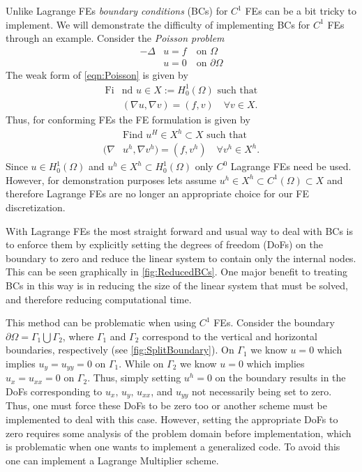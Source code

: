 Unlike Lagrange FEs \emph{boundary conditions} (BCs) for $C^1$ FEs can be a bit
tricky to implement. We will demonstrate the difficulty of implementing BCs for
$C^1$ FEs through an example. Consider the \emph{Poisson problem}
\begin{equation}
  \begin{split}
    -\Delta &u = f \quad \text{on } \Omega \\
    &u = 0 \quad \text{on } \partial \Omega
  \end{split}
  \label{eqn:Poisson}
\end{equation}
The weak form of \eqref{eqn:Poisson} is given by
\begin{equation}
  \begin{split}
    \text{Fi}&\text{nd }u \in X := H^1_0(\Omega) \text{ such that} \\
    &(\nabla u, \nabla v) = (f, v) \quad \forall v \in X.
  \end{split}
  \label{eqn:PoissonWeak}
\end{equation}
Thus, for conforming FEs the FE formulation is given by
\begin{equation}
  \begin{split}
    &\text{Find }u^H \in X^h \subset X \text{ such that} \\
    (\nabla &u^h, \nabla v^h) = (f, v^h) \quad \forall v^h \in X^h.
  \end{split}
  \label{eqn:PoissonFE}
\end{equation}
Since $u \in H^1_0(\Omega)$ and $u^h \in X^h \subset H^1_0(\Omega)$ only $C^0$
Lagrange FEs need be used. However, for demonstration purposes lets assume $u^h
\in X^h \subset C^1(\Omega) \subset X$ and therefore Lagrange FEs are no longer
an appropriate choice for our FE discretization.

With Lagrange FEs the most straight forward and usual way to deal with BCs is to
enforce them by explicitly setting the degrees of freedom (DoFs) on the boundary
to zero and reduce the linear system to contain only the internal nodes. This
can be seen graphically in \autoref{fig:ReducedBCs}. One major benefit to
treating BCs in this way is in reducing the size of the linear system that must
be solved, and therefore reducing computational time.


This method can be problematic when using $C^1$ FEs. Consider the boundary
$\partial \Omega = \Gamma_1 \bigcup \Gamma_2$, where $\Gamma_1$ and $\Gamma_2$
correspond to the vertical and horizontal boundaries, respectively (see
\autoref{fig:SplitBoundary}).  On $\Gamma_1$ we know $u=0$ which implies $u_y =
u_{yy} = 0$ on $\Gamma_1$.  While on $\Gamma_2$ we know $u=0$ which implies $u_x
= u_{xx} = 0$ on $\Gamma_2$. Thus, simply setting $u^h = 0$ on the boundary
results in the DoFs corresponding to $u_x,\,u_y,\,u_{xx}$, and $u_{yy}$ not
necessarily being set to zero. Thus, one must force these DoFs to be zero too or
another scheme must be implemented to deal with this case. However, setting the
appropriate DoFs to zero requires some analysis of the problem domain before
implementation, which is problematic when one wants to implement a generalized
code. To avoid this one can implement a Lagrange Multiplier scheme.


